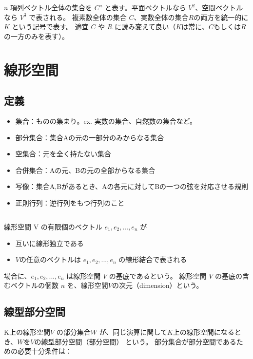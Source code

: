 \documentclass[10pt,a4paper,uplatex]{jsarticle}
\begin{document}
$n$ 項列ベクトル全体の集合を $C^{n}$ と表す。平面ベクトルなら $V^2$、空間ベクトルなら $V^3$ で表される。
複素数全体の集合 $C$、実数全体の集合$R$の両方を統一的に $K$ という記号で表す。
適宜 $C$ や $R$ に読み変えて良い（$K$は常に、$C$もしくは$R$の一方のみを表す）。

\section{線形空間}

\subsection{定義}

\begin{itemize}
	\item 集合：ものの集まり。ex. 実数の集合、自然数の集合など。
	\item 部分集合：集合Aの元の一部分のみからなる集合
	\item 空集合：元を全く持たない集合
	\item 合併集合：Aの元、Bの元の全部からなる集合
	\item 写像：集合A,Bがあるとき、Aの各元に対してBの一つの弦を対応させる規則
	\item 正則行列：逆行列をもつ行列のこと
\end{itemize}

\subsection{}

線形空間 V の有限個のベクトル  $e_1,e_2,...,e_n$ が
\begin{itemize}
	\item 互いに線形独立である
	\item $V$の任意のベクトルは $e_1,e_2,...,e_n$ の線形結合で表される
\end{itemize}

場合に、$e_1,e_2,...,e_n$ は線形空間 $V$ の基底であるという。
線形空間 $V$ の基底の含むベクトルの個数 $n$ を、線形空間$V$の次元（dimension）という。


\subsection{線型部分空間}

K上の線形空間$V$ の部分集合$W$ が、同じ演算に関して$K$上の線形空間になるとき、$W$を$V$の線型部分空間（部分空間）
という。
部分集合が部分空間であるための必要十分条件は：
\end{document}
